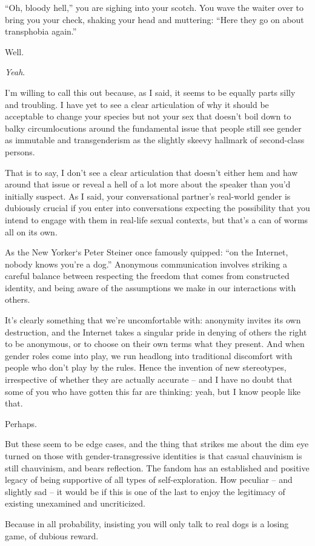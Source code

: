 ``Oh, bloody hell,'' you are sighing into your scotch. You wave the waiter over to bring you your check, shaking your head and muttering: ``Here they go on about transphobia again.''

Well.

\textit{Yeah}.

I’m willing to call this out because, as I said, it seems to be equally parts silly and troubling. I have yet to see a clear articulation of why it should be acceptable to change your species but not your sex that doesn’t boil down to balky circumlocutions around the fundamental issue that people still see gender as immutable and transgenderism as the slightly skeevy hallmark of second-class persons.

That is to say, I don’t see a clear articulation that doesn’t either hem and haw around that issue or reveal a hell of a lot more about the speaker than you’d initially suspect. As I said, your conversational partner’s real-world gender is dubiously crucial if you enter into conversations expecting the possibility that you intend to engage with them in real-life sexual contexts, but that’s a can of worms all on its own.

As the New Yorker‘s Peter Steiner once famously quipped: ``on the Internet, nobody knows you’re a dog.'' Anonymous communication involves striking a careful balance between respecting the freedom that comes from constructed identity, and being aware of the assumptions we make in our interactions with others.

It’s clearly something that we’re uncomfortable with: anonymity invites its own destruction, and the Internet takes a singular pride in denying of others the right to be anonymous, or to choose on their own terms what they present. And when gender roles come into play, we run headlong into traditional discomfort with people who don’t play by the rules. Hence the invention of new stereotypes, irrespective of whether they are actually accurate -- and I have no doubt that some of you who have gotten this far are thinking: yeah, but I know people like that.

Perhaps.

But these seem to be edge cases, and the thing that strikes me about the dim eye turned on those with gender-transgressive identities is that casual chauvinism is still chauvinism, and bears reflection. The fandom has an established and positive legacy of being supportive of all types of self-exploration. How peculiar -- and slightly sad -- it would be if this is one of the last to enjoy the legitimacy of existing unexamined and uncriticized.

Because in all probability, insisting you will only talk to real dogs is a losing game, of dubious reward.
